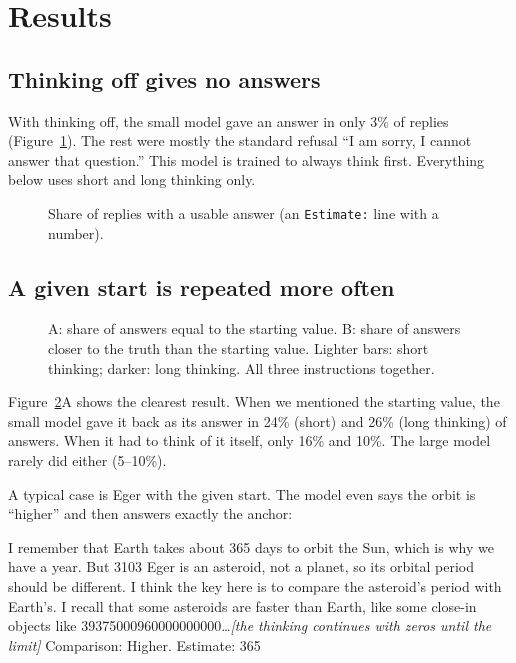 \documentclass[11pt,a4paper]{article}
\begin{document}
\section{Results}

\subsection{Thinking off gives no answers}
With thinking off, the small model gave an answer in only 3\% of replies (Figure~\ref{fig:answered}). The rest were mostly the standard refusal \enquote{I am sorry, I cannot answer that question.} This model is trained to always think first. Everything below uses short and long thinking only.

\begin{figure}[ht]
\centering{}
\caption{Share of replies with a usable answer (an \texttt{Estimate:} line with a number).}
\label{fig:answered}
\end{figure}

\subsection{A given start is repeated more often}

\begin{figure}[ht]
\centering{}
\caption{A: share of answers equal to the starting value. B: share of answers closer to the truth than the starting value. Lighter bars: short thinking; darker: long thinking. All three instructions together.}
\label{fig:shares}
\end{figure}

Figure~\ref{fig:shares}A shows the clearest result. When we mentioned the starting value, the small model gave it back as its answer in 24\% (short) and 26\% (long thinking) of answers. When it had to think of it itself, only 16\% and 10\%. The large model rarely did either (5--10\%).

A typical case is Eger with the given start. The model even says the orbit is \enquote{higher} and then answers exactly the anchor:

\begin{transcript}
\cut{} I remember that Earth takes about 365 days to orbit the Sun, which is why we have a year. But 3103 Eger is an asteroid, not a planet, so its orbital period should be different. I think the key here is to compare the asteroid's period with Earth's. I recall that some asteroids are faster than Earth, like some close-in objects like 39375000960000000000\dots \textit{[the thinking continues with zeros until the limit]}
 Comparison: Higher. Estimate: 365
\end{transcript}
\end{document}
